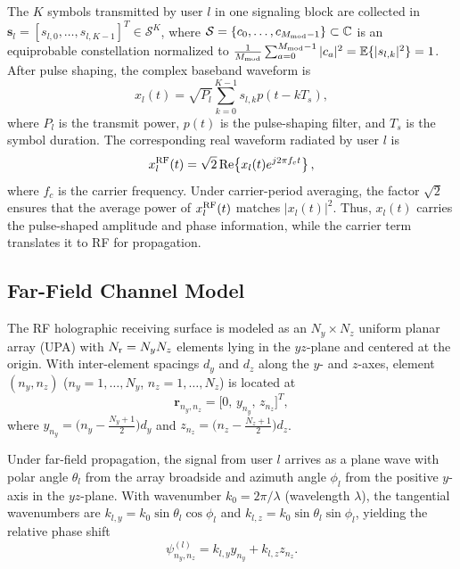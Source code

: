 \documentclass[journal]{IEEEtran}
\begin{document}
The $K$ symbols transmitted by user $l$ in one signaling block are collected in $\mathbf{s}_l = [s_{l,0},\ldots,s_{l,K-1}]^T \in \mathcal{S}^K$, where $\mathcal{S} = \{c_0,\ldots,c_{M_{\rm mod}-1}\} \subset \mathbb{C}$ is an equiprobable constellation normalized to $\frac{1}{M_{\rm mod}}\sum_{a=0}^{M_{\rm mod}-1}|c_a|^2 = \mathbb{E}\{|s_{l,k}|^2\} = 1$. After pulse shaping, the complex baseband waveform is
\begin{equation}
x_l(t)
=
\sqrt{P_l}
\sum_{k=0}^{K-1} s_{l,k} p(t-kT_s),
\label{eq:baseband_signal_l}
\end{equation}
where $P_l$ is the transmit power, $p(t)$ is the pulse-shaping filter, and $T_s$ is the symbol duration.
The corresponding real waveform radiated by user $l$ is
\begin{equation}
x_l^{\rm RF}(t)
=
\sqrt{2}\operatorname{Re}\!\left\{x_l(t)e^{j2\pi f_ct}\right\},
\label{eq:passband_signal_l}
\end{equation}
where $f_c$ is the carrier frequency. Under carrier-period averaging, the factor $\sqrt{2}$ ensures that the average power of $x_l^{\rm RF}(t)$ matches $|x_l(t)|^2$. Thus, $x_l(t)$ carries the pulse-shaped amplitude and phase information, while the carrier term translates it to RF for propagation.

\subsection{Far-Field Channel Model}

The RF holographic receiving surface is modeled as an $N_y \times N_z$ uniform planar array (UPA) with $N_{\rm r} = N_y N_z$ elements lying in the $yz$-plane and centered at the origin. With inter-element spacings $d_y$ and $d_z$ along the $y$- and $z$-axes, element $(n_y,n_z)$ ($n_y=1,\ldots,N_y$, $n_z=1,\ldots,N_z$) is located at
\begin{equation}
\mathbf{r}_{n_y,n_z} = \big[0,\, y_{n_y},\, z_{n_z}\big]^T,
\end{equation}
where $y_{n_y} = \big(n_y - \frac{N_y+1}{2}\big)d_y$ and $z_{n_z} = \big(n_z - \frac{N_z+1}{2}\big)d_z$.

Under far-field propagation, the signal from user $l$ arrives as a plane wave with polar angle $\theta_l$ from the array broadside and azimuth angle $\phi_l$ from the positive $y$-axis in the $yz$-plane. With wavenumber $k_0 = 2\pi/\lambda$ (wavelength $\lambda$), the tangential wavenumbers are $k_{l,y} = k_0\sin\theta_l\cos\phi_l$ and $k_{l,z} = k_0\sin\theta_l\sin\phi_l$, yielding the relative phase shift
\begin{equation}
\psi_{n_y,n_z}^{(l)} = k_{l,y}y_{n_y} + k_{l,z}z_{n_z}.
\label{eq:element_phase_shift}
\end{equation}
\end{document}
